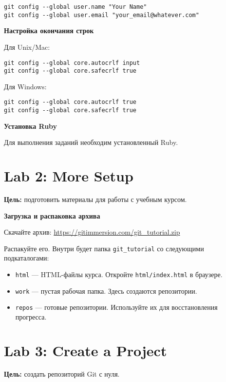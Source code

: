 \documentclass[a4paper,12pt]{report}
\begin{document}
\begin{verbatim}
git config --global user.name "Your Name"
git config --global user.email "your_email@whatever.com"
\end{verbatim}

\textbf{Настройка окончания строк}

Для Unix/Mac:
\begin{verbatim}
git config --global core.autocrlf input
git config --global core.safecrlf true
\end{verbatim}

Для Windows:
\begin{verbatim}
git config --global core.autocrlf true
git config --global core.safecrlf true
\end{verbatim}

\textbf{Установка Ruby}

Для выполнения заданий необходим установленный Ruby.


\section{Lab 2: More Setup}
\textbf{Цель:} подготовить материалы для работы с учебным курсом.

\textbf{Загрузка и распаковка архива}

Скачайте архив: \url{https://gitimmersion.com/git_tutorial.zip}

Распакуйте его. Внутри будет папка \texttt{git\_tutorial} со следующими подкаталогами:
\begin{itemize}
  \item \texttt{html} — HTML-файлы курса. Откройте \texttt{html/index.html} в браузере.
  \item \texttt{work} — пустая рабочая папка. Здесь создаются репозитории.
  \item \texttt{repos} — готовые репозитории. Используйте их для восстановления прогресса.
\end{itemize}


\section{Lab 3: Create a Project}
\textbf{Цель:} создать репозиторий Git с нуля.
\end{document}
